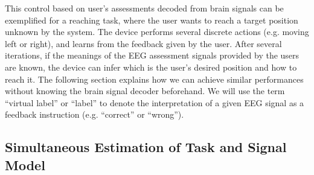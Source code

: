 \documentclass[letterpaper]{article}
\begin{document}
This control based on user's assessments decoded from brain signals can be exemplified for a reaching task, where the user wants to reach a target position unknown by the system. The device performs several discrete actions (e.g. moving left or right), and learns from the feedback given by the user. After several iterations, if the meanings of the EEG assessment signals provided by the users are known, the device can infer which is the user's desired position and how to reach it. The following section explains how we can achieve similar performances without knowing the brain signal decoder beforehand. We will use the term ``virtual label'' or ``label'' to denote the interpretation of a given EEG signal as a feedback instruction (e.g. ``correct'' or ``wrong'').

\subsection{Simultaneous Estimation of Task and Signal Model}
\label{sec:Algorithm}
\end{document}

